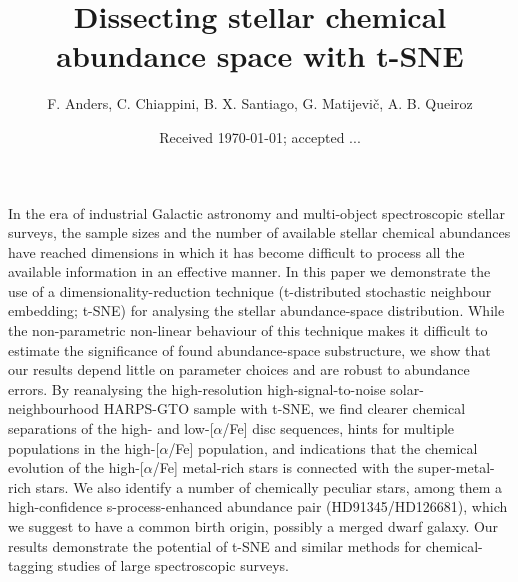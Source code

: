 \documentclass{aa}  %
\begin{document}
 

   \title{Dissecting stellar chemical abundance space with t-SNE}

   \author{F. Anders, C. Chiappini, B. X. Santiago, G. Matijevi\v{c}, A. B. Queiroz%
   }
   
   

   \date{Received \today; accepted ...}

  \abstract
   {%
   In the era of industrial Galactic astronomy and multi-object spectroscopic stellar surveys, the sample sizes and the number of available stellar chemical abundances have reached dimensions in which it has become difficult to process all the available information in an effective manner. In this paper we demonstrate the use of a dimensionality-reduction technique (t-distributed stochastic neighbour embedding; t-SNE) for analysing the stellar abundance-space distribution. While the non-parametric non-linear behaviour of this technique makes it difficult to estimate the significance of found abundance-space substructure, we show that our results depend little on parameter choices and are robust to abundance errors. By reanalysing the high-resolution high-signal-to-noise solar-neighbourhood HARPS-GTO sample with t-SNE, we find clearer chemical separations of the high- and low-[$\alpha$/Fe] disc sequences, hints for multiple populations in the high-[$\alpha$/Fe] population, and indications that the chemical evolution of the high-[$\alpha$/Fe] metal-rich stars is connected with the super-metal-rich stars. We also identify a number of chemically peculiar stars, among them a high-confidence s-process-enhanced abundance pair (HD91345/HD126681), which we suggest to have a common birth origin, possibly a merged dwarf galaxy. Our results demonstrate the potential of t-SNE and similar methods for chemical-tagging studies of large spectroscopic surveys.}
\end{document}
